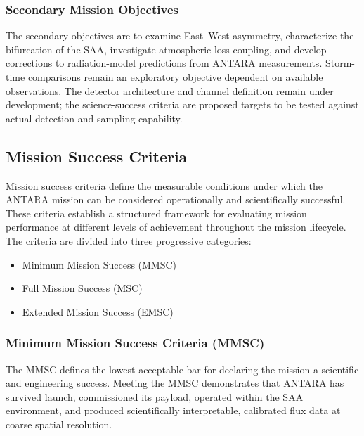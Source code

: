 \subsubsection{Secondary Mission Objectives}\label{b.-secondary-mission-objectives}
The secondary objectives are to examine East--West asymmetry, characterize the bifurcation of the SAA, investigate atmospheric-loss coupling, and develop corrections to radiation-model predictions from ANTARA measurements. Storm-time comparisons remain an exploratory objective dependent on available observations. The detector architecture and channel definition remain under development; the science-success criteria are proposed targets to be tested against actual detection and sampling capability.

\subsection{Mission Success Criteria}\label{mission-success-criteria}

Mission success criteria define the measurable conditions under which
the ANTARA mission can be considered operationally and scientifically
successful. These criteria establish a structured framework for
evaluating mission performance at different levels of achievement
throughout the mission lifecycle. The criteria are divided into three
progressive categories:

\begin{itemize}
\item
  Minimum Mission Success (MMSC)
\item
  Full Mission Success (MSC)
\item
  Extended Mission Success (EMSC)
\end{itemize}

\subsubsection{Minimum Mission Success Criteria (MMSC)}\label{minimum-mission-success-criteria-mmsc}The MMSC defines the lowest acceptable bar for declaring the mission a
scientific and engineering success. Meeting the MMSC demonstrates that
ANTARA has survived launch, commissioned its payload, operated within
the SAA environment, and produced scientifically interpretable,
calibrated flux data at coarse spatial resolution.


